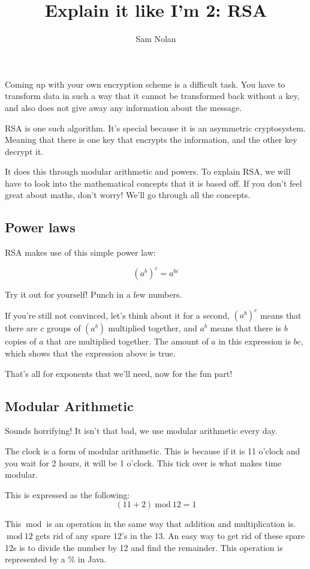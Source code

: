 \documentclass{article}
\author{Sam Nolan}
\title{Explain it like I'm 2: RSA}
\newcommand{\inmod}{\ \text{mod}\ }
\begin{document}
  \maketitle

  Coming up with your own encryption scheme is a difficult task. You have to transform data in such a way that it cannot be transformed back without a key, and also does not give away any information about the message.

  RSA is one such algorithm. It's special because it is an asymmetric cryptosystem. Meaning that there is one key that encrypts the information, and the other key decrypt it.
  
  It does this through modular arithmetic and powers. To explain RSA, we will have to look into the mathematical concepts that it is based off. If you don't feel great about maths, don't worry! We'll go through all the concepts.

  \subsection*{Power laws}
  RSA makes use of this simple power law:

  \[ (a^{b})^c = a^{bc} \]

  Try it out for yourself! Punch in a few numbers.

  If you're still not convinced, let's think about it for a second, $(a^b)^c$ means that there are $c$ groups of $(a^b)$ multiplied together, and $a^b$ means that there is $b$ copies of $a$ that are multiplied together. The amount of $a$ in this expression is $bc$, which shows that the expression above is true.

  That's all for exponents that we'll need, now for the fun part!

  \subsection*{Modular Arithmetic}
  Sounds horrifying! It isn't that bad, we use modular arithmetic every day.

  The clock is a form of modular arithmetic. This is because if it is 11 o'clock and you wait for 2 hours, it will be 1 o'clock. This tick over is what makes time modular.

  This is expressed as the following:
  \[ (11 + 2) \inmod 12 = 1 \]

  This $\inmod$ is an operation in the same way that addition and multiplication is. $\inmod 12$ gets rid of any spare 12's in the 13. An easy way to get rid of these spare 12s is to divide the number by 12 and find the remainder. This operation is represented by a \% in Java.
\end{document}
